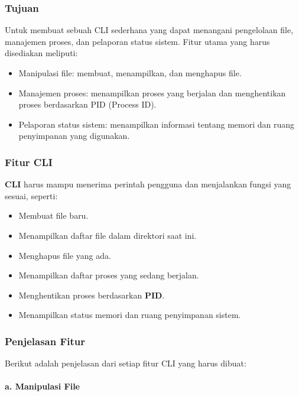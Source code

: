 \documentclass[12pt]{article}
\begin{document}
\subsubsection{Tujuan}
Untuk membuat sebuah CLI sederhana yang dapat menangani pengelolaan file, manajemen proses, dan pelaporan status sistem. Fitur utama yang harus disediakan meliputi:

\begin{itemize}
    \item Manipulasi file: membuat, menampilkan, dan menghapus file.
    \item Manajemen proses: menampilkan proses yang berjalan dan menghentikan proses berdasarkan PID (Process ID).
    \item Pelaporan status sistem: menampilkan informasi tentang memori dan ruang penyimpanan yang digunakan.
\end{itemize}


\subsubsection{\textbf{Fitur CLI}}

\textbf{CLI} harus mampu menerima perintah pengguna dan menjalankan fungsi yang sesuai, seperti:

\begin{itemize}
    \item Membuat file baru.
    \item Menampilkan daftar file dalam direktori saat ini.
    \item Menghapus file yang ada.
    \item Menampilkan daftar proses yang sedang berjalan.
    \item Menghentikan proses berdasarkan \textbf{PID}.
    \item Menampilkan status memori dan ruang penyimpanan sistem.
\end{itemize}

\subsubsection{Penjelasan Fitur}

Berikut adalah penjelasan dari setiap fitur CLI yang harus dibuat:

\paragraph{a. \textbf{Manipulasi File}}
\end{document}
